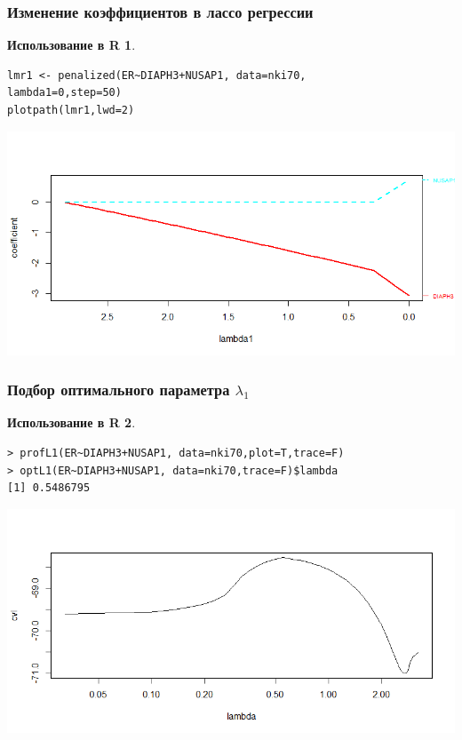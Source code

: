 \documentclass{beamer}
\newtheorem{exmpr}{Использование в R}
\begin{document}
\begin{frame}[containsverbatim]
\frametitle{Изменение коэффициентов в лассо регрессии}
\begin{exmpr}
\begin{verbatim}
lmr1 <- penalized(ER~DIAPH3+NUSAP1, data=nki70,
lambda1=0,step=50)
plotpath(lmr1,lwd=2)
\end{verbatim}
\end{exmpr}
\includegraphics[width=1\textwidth,height=0.6\textheight]{penalizedplot1.png}
\end{frame}

\begin{frame}[containsverbatim]
\frametitle{Подбор оптимального параметра $\lambda_1$}
\begin{exmpr}
\begin{verbatim}
> profL1(ER~DIAPH3+NUSAP1, data=nki70,plot=T,trace=F)
> optL1(ER~DIAPH3+NUSAP1, data=nki70,trace=F)$lambda
[1] 0.5486795
\end{verbatim}
\end{exmpr}
\includegraphics[width=1\textwidth,height=0.6\textheight]{penalizedplot2.png}
\end{frame}
\end{document}
